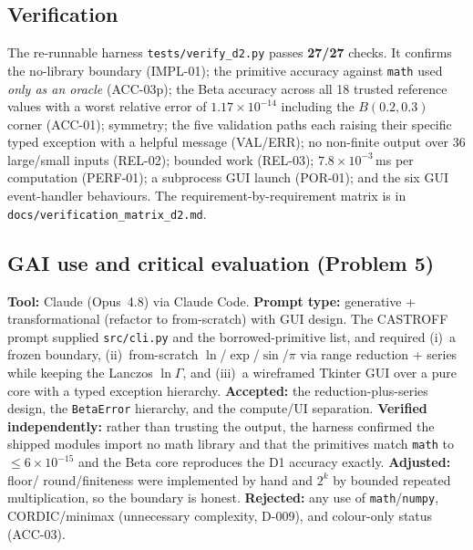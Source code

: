 \documentclass[11pt,a4paper]{article}
\begin{document}
\subsection{Verification}
\label{sec:verify}
The re-runnable harness \texttt{tests/verify\_d2.py} passes \textbf{27/27}
checks. It confirms the no-library boundary (IMPL-01); the primitive accuracy
against \texttt{math} used \emph{only as an oracle} (ACC-03p); the Beta accuracy
across all 18 trusted reference values with a worst relative error of
$1.17\times10^{-14}$ including the $B(0.2,0.3)$ corner (ACC-01); symmetry; the
five validation paths each raising their specific typed exception with a helpful
message (VAL/ERR); no non-finite output over 36 large/small inputs (REL-02);
bounded work (REL-03); $7.8\times10^{-3}$\,ms per computation (PERF-01); a
subprocess GUI launch (POR-01); and the six GUI event-handler behaviours. The
requirement-by-requirement matrix is in
\texttt{docs/verification\_matrix\_d2.md}.

\subsection{GAI use and critical evaluation (Problem 5)}
\textbf{Tool:} Claude (Opus~4.8) via Claude Code. \textbf{Prompt type:}
generative + transformational (refactor to from-scratch) with GUI design. The
CASTROFF prompt supplied \texttt{src/cli.py} and the borrowed-primitive list, and
required (i)~a frozen boundary, (ii)~from-scratch $\ln$/$\exp$/$\sin$/$\pi$ via
range reduction + series while keeping the Lanczos $\ln\Gamma$, and (iii)~a
wireframed Tkinter GUI over a pure core with a typed exception hierarchy.
\textbf{Accepted:} the reduction-plus-series design, the \texttt{BetaError}
hierarchy, and the compute/UI separation. \textbf{Verified independently:} rather
than trusting the output, the harness confirmed the shipped modules import no
math library and that the primitives match \texttt{math} to $\le6\times10^{-15}$
and the Beta core reproduces the D1 accuracy exactly. \textbf{Adjusted:} floor/
round/finiteness were implemented by hand and $2^{k}$ by bounded repeated
multiplication, so the boundary is honest. \textbf{Rejected:} any use of
\texttt{math}/\texttt{numpy}, CORDIC/minimax (unnecessary complexity, D-009), and
colour-only status (ACC-03).

\end{document}
